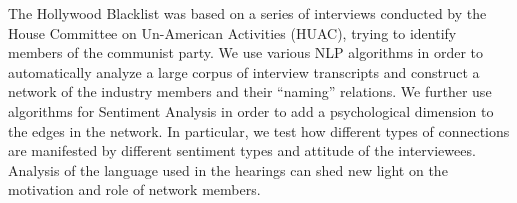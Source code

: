 The Hollywood Blacklist was  based on a series of interviews conducted by the House Committee on Un-American Activities (HUAC), trying to identify members of the communist party. We use various NLP algorithms in order to automatically analyze a large corpus of interview transcripts and construct a network of the industry members and their ``naming'' relations. We further use algorithms for Sentiment Analysis in order to add a psychological dimension to the edges in the network. In particular, we test how different types of connections are manifested by different sentiment types and attitude of the interviewees. Analysis of the language used in the hearings can shed new light on the motivation and role of network members.
